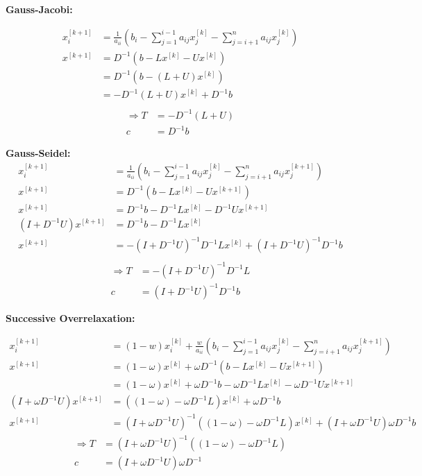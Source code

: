{\color{blue}

\textbf{Gauss-Jacobi:}

\begin{align*}
x_i^{[k+1]} &= \frac{1}{a_{ii}} \left( b_i - \sum_{j=1}^{i-1} a_{ij} x_j^{[k]} - \sum_{j=i+1}^n a_{ij} x_j^{[k]} \right) \\
x^{[k+1] }&= D^{-1} \left( b - L x^{[k]} - U x^{[k]} \right) \\
&= D^{-1} \left( b - \left(L + U\right) x^{[k]} \right) \\
&= -D^{-1} \left( L + U \right) x^{[k]} + D^{-1} b \\
\end{align*}
\begin{align*}
\Rightarrow T &= -D^{-1} \left( L + U \right) \\
c &= D^{-1} b
\end{align*}

\textbf{Gauss-Seidel:}
\begin{align*}
x_i^{[k+1]} &= \frac{1}{a_{ii}} \left(b_i - \sum_{j=1}^{i-1} a_{ij}
x_j^{[k]} - \sum_{j=i+1}^n a_{ij} x_j^{[k+1]} \right) \\
x^{[k+1] }&= D^{-1} \left( b - L x^{[k]} - U x^{[k+1]} \right) \\
x^{[k+1] }&= D^{-1} b - D^{-1} L x^{[k]} - D^{-1} U x^{[k+1]}  \\
(I + D^{-1} U) x^{[k+1]} &= D^{-1} b - D^{-1} L x^{[k]} \\
x^{[k+1]} &= - (I + D^{-1} U)^{-1} D^{-1} L x^{[k]} + (I + D^{-1} U)^{-1} D^{-1} b  \\
\end{align*}
\begin{align*}
\Rightarrow
T &= - (I + D^{-1} U)^{-1} D^{-1} L \\
c &= (I + D^{-1} U)^{-1} D^{-1} b
\end{align*}

\textbf{Successive Overrelaxation:}

\begin{align*}
x_i^{[k+1]} &= (1 - w)x_i^{[k]} + \frac{w}{a_{ii}} \left(b_i
- \sum_{j=1}^{i-1} a_{ij} x_j^{[k]} - \sum_{j=i+1}^n a_{ij}
x_j^{[k+1]} \right) \\
x^{[k+1]} &= \left(1-\omega\right) x^{[k]} + \omega D^{-1} \left( b -
L x^{[k]} - U x^{[k+1]}\right) \\
&= \left( 1 - \omega \right) x^{[k]} + \omega D^{-1} b - \omega
D^{-1} L x^{[k]} - \omega D^{-1} U x^{[k+1]} \\
\left( I + \omega D^{-1} U \right) x^{[k+1]} &= \left( \left( 1
- \omega \right)  - \omega D^{-1} L \right)  x^{[k]} + \omega D^{-1} b \\
x^{[k+1]} &= \left( I + \omega D^{-1} U \right)^{-1} \left( \left( 1
- \omega \right) - \omega D^{-1} L \right) x^{[k]} + \left( I
+ \omega D^{-1} U \right) \omega D^{-1} b
\end{align*}
\begin{align*}
\Rightarrow
T &= \left( I + \omega D^{-1} U \right)^{-1} \left( \left( 1
- \omega \right) - \omega D^{-1} L \right)\\
c &= \left( I + \omega D^{-1} U \right) \omega D^{-1}
\end{align*}

}
